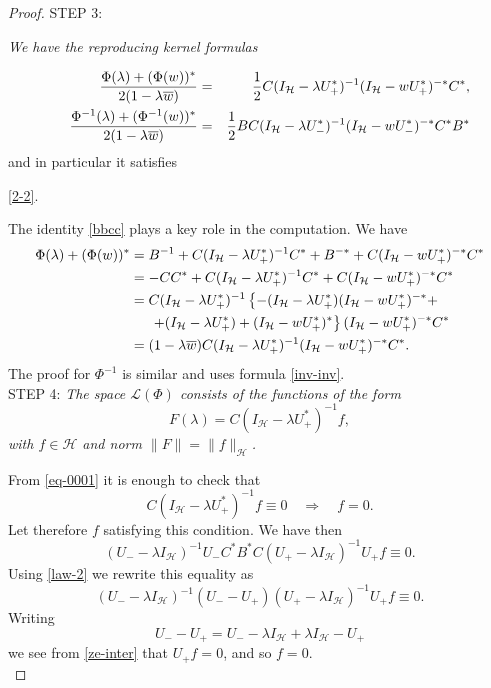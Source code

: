 \documentclass[12pt]{amsart}
\theoremstyle{definition}
\theoremstyle{remark}
\numberwithin{equation}{section}
\begin{document}
\begin{proof}
STEP 3: {\sl We have the reproducing kernel formulas



  \begin{eqnarray}
    \label{eq-0001}
    \hspace{5mm}\frac{\Phi(\lambda)+(\Phi(w))^*}{2(1-\lambda\overline{w})}&=&\frac{1}{2}
                                                                              C(I_{\mathcal H}-\lambda U_+^*)^{-1}(I_{\mathcal H}-wU_+^*)^{-*}C^*,\\
    \hspace{5mm} \frac{\Phi^{-1}(\lambda)+(\Phi^{-1}(w))^*}{2(1-\lambda\overline{w})}&=&\frac{1}{2}
                                                                                         BC(I_{\mathcal H}-\lambda U_-^*)^{-1}(I_{\mathcal H}-w U_-^*)^{-*}C^*B^*
                                                                                        \nonumber
  \end{eqnarray}
  and in particular it satisfies}\eqref{2-2}.\smallskip



The identity \eqref{bbcc} plays a key role in the computation. We have
\[
  \begin{split}
    \Phi(\lambda)+(\Phi(w))^*&=B^{-1}+C(I_{\mathcal H}-\lambda U_+^*)^{-1}C^*+B^{-*}+C(I_{\mathcal H}-w U_+^*)^{-*}C^*\\
    &=-CC^*+C(I_{\mathcal H}-\lambda U_+^*)^{-1}C^*+C(I_{\mathcal H}-w U_+^*)^{-*}C^*\\
    &=C(I_{\mathcal H}-\lambda U_+^*)^{-1}\left\{-(I_{\mathcal H}-\lambda U_+^*)(I_{\mathcal H}-w U_+^*)^{-*}+\right.\\
    &\left.\hspace{5mm}+(I_{\mathcal H}-\lambda U_+^*)      +(I_{\mathcal H}-w U_+^*)^*
    \right\}(I_{\mathcal H}- w U_+^*)^{-*}C^*\\
    &=(1-\lambda\overline{w})C(I_{\mathcal H}-\lambda U_+^*)^{-1}(I_{\mathcal H}- w U_+^*)^{-*}C^*.
  \end{split}
  \]
  The proof for $\Phi^{-1}$ is similar and uses formula \eqref{inv-inv}.\\

STEP 4: {\sl The space $\mathcal L(\Phi)$ consists of the functions of the form
\[
  F(\lambda)=C(I_{\mathcal H}-\lambda U_+^*)^{-1}f,
\]
  with $f\in\mathcal H$ and norm $\|F\|=\|f\|_{\mathcal H}$.}\smallskip

From \eqref{eq-0001} it is enough to check that
\[
  C(I_{\mathcal H}-\lambda U_+^*)^{-1}f\equiv 0\quad\Longrightarrow\quad f=0.
  \]
Let therefore $f$ satisfying this condition. We have then
  \[
(U_--\lambda I_{\mathcal H})^{-1}U_-C^*B^*C(U_+-\lambda I_{\mathcal H})^{-1}U_+f\equiv 0.
    \]
Using \eqref{law-2} we rewrite this equality as
  \[
(U_--\lambda I_{\mathcal H})^{-1}(U_--U_+)(U_+-\lambda I_{\mathcal H})^{-1}U_+f\equiv 0.
    \]
    Writing
    $$U_--U_+=U_--\lambda I_{\mathcal H}+\lambda I_{\mathcal H}-U_+$$
    we see  from \eqref{ze-inter} that $U_+f=0$, and so $f=0$.\\



\end{proof}
\end{document}
